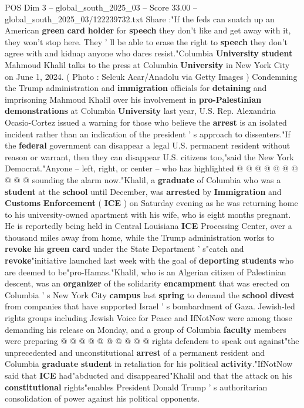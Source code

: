 \begin{textsample}{POS Dim 3 – global\_south\_2025\_03 – Score 33.00 – global\_south\_2025\_03/122239732.txt}  \label{ex:f3_pos_034}
Share :"If the feds can snatch up an American \textbf{green} \textbf{card} \textbf{holder} for \textbf{speech} they don't like and get away with it, they won't stop here.
They ' ll be able to erase the right to \textbf{speech} they don't agree with and kidnap anyone who dares resist."Columbia \textbf{University} \textbf{student} Mahmoud Khalil talks to the press at Columbia \textbf{University} in New York City on June 1, 2024. ( Photo : Selcuk Acar/Anadolu via Getty Images ) Condemning the Trump administration and \textbf{immigration} officials for \textbf{detaining} and imprisoning Mahmoud Khalil over his involvement in \textbf{pro-Palestinian} \textbf{demonstrations} at Columbia \textbf{University} last year, U.S.
Rep.
Alexandria Ocasio-Cortez issued a warning for those who believe the \textbf{arrest} is an isolated incident rather than an indication of the president ' s approach to dissenters."If the \textbf{federal} government can disappear a legal U.S. permanent resident without reason or warrant, then they can disappear U.S. citizens too,"said the New York Democrat."Anyone -- left, right, or center -- who has highlighted @ @ @ @ @ @ @ @ @ @ sounding the alarm now."Khalil, a \textbf{graduate} of Columbia who was a \textbf{student} at the \textbf{school} until December, was \textbf{arrested} by \textbf{Immigration} and \textbf{Customs} \textbf{Enforcement} ( \textbf{ICE} ) on Saturday evening as he was returning home to his university-owned apartment with his wife, who is eight months pregnant.
He is reportedly being held in Central Louisiana \textbf{ICE} Processing Center, over a thousand miles away from home, while the Trump administration works to \textbf{revoke} his \textbf{green} \textbf{card} under the State Department ' s"catch and \textbf{revoke}"initiative launched last week with the goal of \textbf{deporting} \textbf{students} who are deemed to be"pro-Hamas."Khalil, who is an Algerian citizen of Palestinian descent, was an \textbf{organizer} of the solidarity \textbf{encampment} that was erected on Columbia ' s New York City \textbf{campus} last \textbf{spring} to demand the \textbf{school} \textbf{divest} from companies that have supported Israel ' s bombardment of Gaza.
Jewish-led rights groups including Jewish Voice for Peace and IfNotNow were among those demanding his release on Monday, and a group of Columbia \textbf{faculty} members were preparing @ @ @ @ @ @ @ @ @ @ rights defenders to speak out against"the unprecedented and unconstitutional \textbf{arrest} of a permanent resident and Columbia \textbf{graduate} \textbf{student} in retaliation for his political \textbf{activity}."IfNotNow said that \textbf{ICE} had"abducted and disappeared"Khalil and that the attack on his \textbf{constitutional} rights"enables President Donald Trump ' s authoritarian consolidation of power against his political opponents.

\end{textsample}
